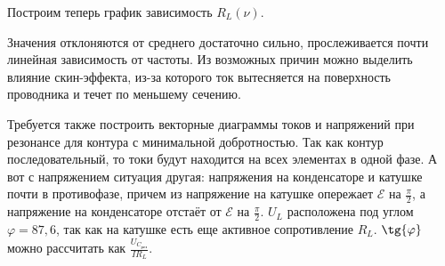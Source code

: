 \documentclass[a4paper, 12pt]{article}
\newcommand{\E}{\mathcal{E}}
\begin{document}



	Построим теперь график зависимость $R_L(\nu)$.


	Значения отклоняются от среднего достаточно сильно, прослеживается почти линейная зависимость от частоты. Из возможных причин можно выделить влияние скин-эффекта, из-за которого ток вытесняется на поверхность проводника и течет по меньшему сечению.


	Требуется также построить векторные диаграммы токов и напряжений при резонансе для контура с минимальной добротностью. Так как контур последовательный, то токи будут находится на всех элементах в одной фазе. А вот с напряжением ситуация другая: напряжения на конденсаторе и катушке почти в противофазе, причем из напряжение на катушке опережает $\E$ на $\frac{\pi}{2}$, а напряжение на конденсаторе отстаёт от $\E$ на $\frac{\pi}{2}$.
	$U_L$ расположена под углом $\varphi = 87,6$\textdegree, так как на катушке есть еще активное сопротивление $R_L$. $\tg{\varphi}$ можно рассчитать как $\frac{U_{C_{\text{рез}}}}{IR_L}$.
\end{document}
